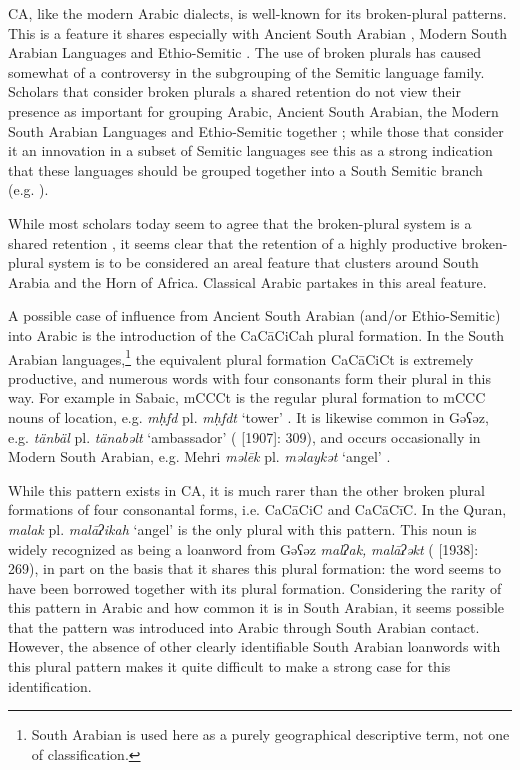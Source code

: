 \documentclass[output=paper]{langsci/langscibook}
\begin{document}
CA, like the modern Arabic dialects, is well-known for its broken-plural patterns. This is a feature it shares especially with Ancient South Arabian \citep[1050--1051]{Stein2011}, Modern South Arabian Languages \citep[1085]{Simeone-Senelle2011} and Ethio-Semitic \citep[1132]{Weninger2011OldEth}. The use of broken plurals has caused somewhat of a controversy in the subgrouping of the Semitic language family. Scholars that consider broken plurals a shared retention do not view their presence as important for grouping Arabic, Ancient South Arabian, the Modern South Arabian Languages and Ethio-Semitic together \citep[159--160]{Huehnergard2005}; while those that consider it an innovation in a subset of Semitic languages see this as a strong indication that these languages should be grouped together into a South Semitic branch (e.g. \citealt{Ratcliffe1998}).

While most scholars today seem to agree that the broken-plural system is a shared retention \citep[1116]{Weninger2011GenEth}, it seems clear that the retention of a highly productive broken-plural system is to be considered an areal feature that clusters around South Arabia and the Horn of Africa. Classical Arabic partakes in this areal feature.

A possible case of influence from Ancient South Arabian (and/or Ethio-Semitic) into Arabic is the introduction of the CaCāCiCah plural formation. In the South Arabian languages,\footnote{South Arabian is used here as a purely geographical descriptive term, not one of classification.} the equivalent plural formation CaCāCiCt is extremely productive, and numerous words with four consonants form their plural in this way. For example in Sabaic, mCCCt is the regular plural formation to mCCC nouns  of location, e.g. \textit{mḥfd} pl. \textit{mḥfdt} ‘tower’ \citep[34]{Beeston1962}. It is likewise common in Gəʕəz, e.g. \textit{tänbäl} pl. \textit{tänabəlt} ‘ambassador’ (\citealt{Dillmann2005} [1907]: 309), and occurs occasionally in Modern South Arabian, e.g. Mehri \textit{məlēk} pl. \textit{məlaykət} ‘angel’ \citep[68]{Rubin2010}.

While this pattern exists in CA, it is much rarer than the other broken plural formations of four consonantal forms, i.e. CaCāCiC and CaCāCīC. In the Quran, \textit{malak} pl. \textit{malāʔikah} ‘angel’ is the only plural with this pattern. This noun is widely recognized as being a loanword from Gəʕəz \textit{malʔak,} \textit{malāʔəkt} (\citealt{Jeffrey2007} [1938]: 269), in part on the basis that it shares this plural formation: the word seems to have been borrowed together with its plural formation. Considering the rarity of this pattern in Arabic and how common it is in South Arabian, it seems possible that the pattern was introduced into Arabic through South Arabian contact. However, the absence of other clearly identifiable South Arabian loanwords with this plural pattern makes it quite difficult to make a strong case for this identification.
\end{document}
